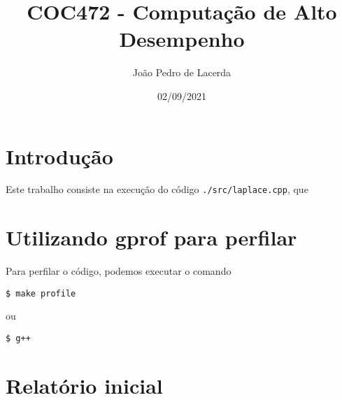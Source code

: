 \documentclass[a4paper,twosidep]{article}
\author{João Pedro de Lacerda}
\date{02/09/2021}
\title{COC472 - Computação de Alto Desempenho}
\begin{document}
\maketitle

\section{Introdução}
\label{sec:org726a7cd}
\begin{COMMENT:}
\end{COMMENT:}

Este trabalho consiste na execução do código \texttt{./src/laplace.cpp}, que

\section{Utilizando gprof para perfilar}
\label{sec:org2487861}
Para perfilar o código, podemos executar o comando
\begin{verbatim}
$ make profile
\end{verbatim}
ou
\begin{verbatim}
$ g++
\end{verbatim}

\section{Relatório inicial}
\label{sec:orgfb5d2d8}
\end{document}
